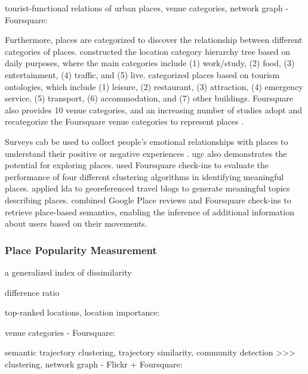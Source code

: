 \documentclass{article}
\begin{document}

tourist-functional relations of urban places, venue categories, network graph - Foursquare: \cite{yang_identifying_2021}

Furthermore, places are categorized to discover the relationship between different categories of places. \underline{\cite{liu_stccd_2020}} constructed the location category hierarchy tree based on daily purposes, where the main categories include (1) work/study, (2) food, (3) entertainment, (4) traffic, and (5) live. \cite{koirala_social_2015} categorized places based on tourism ontologies, which include (1) leisure, (2) restaurant, (3) attraction, (4) emergency service, (5) transport, (6) accommodation, and (7) other buildings. Foursquare also provides 10 venue categories, and an increasing number of studies adopt and recategorize the Foursquare venue categories to represent places \cite{ferreira_uncovering_2020,yang_identifying_2021}.

Surveys cab be used to collect people's emotional relationships with places to understand their positive or negative experiences \citep{manzo_for_2005}. \acrshort{ugc} also demonstrates the potential for exploring places. \cite{wang_using_2015} used Foursquare check-ins to evaluate the performance of four different clustering algorithms in identifying meaningful places. \cite{sui_inferring_2013} applied \acrshort{lda} to georeferenced travel blogs to generate meaningful topics describing places. \cite{hallot_who_2015} combined Google Place reviews and Foursquare check-ins to retrieve place-based semantics, enabling the inference of additional information about users based on their movements.

 
\subsubsection{Place Popularity Measurement}
a generalized index of dissimilarity \cite{sakoda_generalized_1981}

difference ratio \cite{li_analyzing_2018}

top-ranked locations, location importance: \cite{yin_diversified_2011}

venue categories - Foursquare: \cite{ferreira_uncovering_2020}

semantic trajectory clustering, trajectory similarity, community detection >>> clustering, network graph - Flickr + Foursquare: \cite{liu_stccd_2020}
\end{document}
